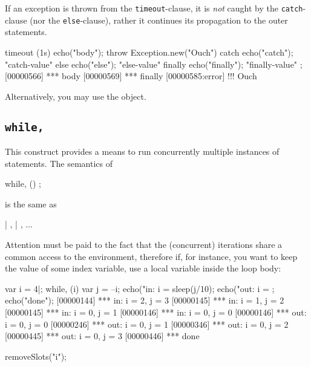 If an exception is thrown from the \lstinline{timeout}-clause, it is
\emph{not} caught by the \lstinline{catch}-clause (nor the
\lstinline{else}-clause), rather it continues its propagation to the outer
statements.

\begin{urbiscript}
timeout (1s)  { echo("body"); throw Exception.new("Ouch") }
catch         { echo("catch"); "catch-value" }
else          { echo("else"); "else-value" }
finally       { echo("finally"); "finally-value" };
[00000566] *** body
[00000569] *** finally
[00000585:error] !!! Ouch
\end{urbiscript}

Alternatively, you may use the  object.

\subsection{\lstinline{while,}}
\label{sec:lang:while:comma}
\experimentalremoved{}

This construct provides a means to run concurrently multiple instances
of statements.  The semantics of

\begin{urbiunchecked}
while, ()
  ;
\end{urbiunchecked}

\noindent
is the same as

\begin{urbiunchecked}
 |  ,  |  , ...
\end{urbiunchecked}

Attention must be paid to the fact that the (concurrent) iterations
share a common access to the environment, therefore if, for instance,
you want to keep the value of some index variable, use a local
variable inside the loop body:

\begin{urbiscript}[firstnumber=1]
var i = 4|;
while, (i)
{
  var j = --i;
  echo("in: i = %
  sleep(j/10);
  echo("out: i = %
};
echo("done");
[00000144] *** in: i = 2, j = 3
[00000145] *** in: i = 1, j = 2
[00000145] *** in: i = 0, j = 1
[00000146] *** in: i = 0, j = 0
[00000146] *** out: i = 0, j = 0
[00000246] *** out: i = 0, j = 1
[00000346] *** out: i = 0, j = 2
[00000445] *** out: i = 0, j = 3
[00000446] *** done
\end{urbiscript}
\begin{urbicomment}
removeSlots("i");
\end{urbicomment}

